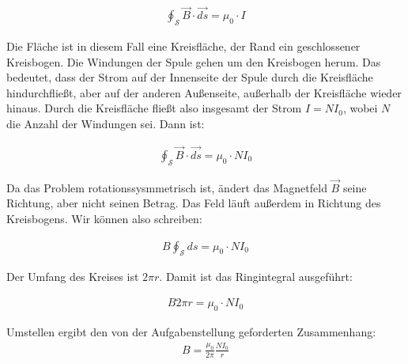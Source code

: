 \documentclass[a4paper,german,12pt,smallheadings]{scrartcl}
\begin{document}
\begin{align*}
  \oint_{\mathcal{S}} \vec{B} \cdot \vec{ds} = \mu_0 \cdot I
\end{align*}

Die Fläche ist in diesem Fall eine Kreisfläche, der Rand ein geschlossener
Kreisbogen. Die Windungen der Spule gehen um den Kreisbogen herum. Das
bedeutet, dass der Strom auf der Innenseite der Spule durch die Kreisfläche
hindurchfließt, aber auf der anderen Außenseite, außerhalb der Kreisfläche
wieder hinaus. Durch die Kreisfläche fließt also insgesamt der Strom $I=NI_0$,
wobei $N$ die Anzahl der Windungen sei. Dann ist:

\begin{align*}
  \oint_{\mathcal{S}} \vec{B} \cdot \vec{ds} = \mu_0 \cdot NI_0
\end{align*}

Da das Problem rotationssysmmetrisch ist, ändert das Magnetfeld $\vec{B}$ seine
Richtung, aber nicht seinen Betrag. Das Feld läuft außerdem in Richtung des
Kreisbogens. Wir können also schreiben:

\begin{align*}
  B \oint_{\mathcal{S}} ds = \mu_0 \cdot NI_0
\end{align*}

Der Umfang des Kreises ist $2\pi r$. Damit ist das Ringintegral ausgeführt:

\begin{align*}
  B 2 \pi r = \mu_0 \cdot NI_0
\end{align*}

Umstellen ergibt den von der Aufgabenstellung geforderten Zusammenhang:
\begin{align*}
  B = \frac{\mu_0}{2 \pi} \frac{NI_0}{r}
\end{align*}
\end{document}

